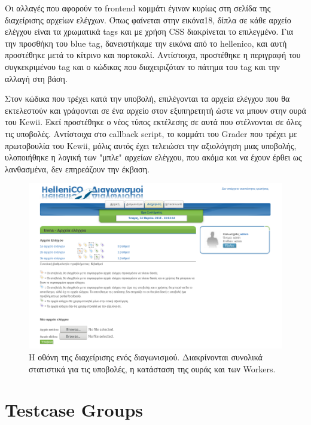 \documentclass[diploma]{softlab-thesis}
\begin{document}
\bigskip

Οι αλλαγές που αφορούν το frontend κομμάτι έγιναν κυρίως στη σελίδα της διαχείρισης
αρχείων ελέγχων. Όπως φαίνεται στην εικόνα18, δίπλα σε κάθε αρχείο ελέγχου είναι
τα χρωματικά tags και με χρήση CSS διακρίνεται το επιλεγμένο. Για την προσθήκη
του blue tag, δανειστήκαμε την εικόνα από το hellenico, και αυτή προστέθηκε μετά
το κίτρινο και πορτοκαλί. Αντίστοιχα, προστέθηκε η περιγραφή του συγκεκριμένου
tag και ο κώδικας που διαχειριζόταν το πάτημα του tag και την αλλαγή στη βάση.

\bigskip

Στον κώδικα που τρέχει κατά την υποβολή, επιλέγονται τα αρχεία ελέγχου που θα
εκτελεστούν και γράφονται σε ένα αρχείο στον εξυπηρετητή ώστε να μπουν στην
ουρά του Kewii. Εκεί προστέθηκε ο νέος τύπος εκτέλεσης σε αυτά που στέλνονται
σε όλες τις υποβολές. Αντίστοιχα στο callback script, το κομμάτι του Grader που
τρέχει με πρωτοβουλία του Kewii, μόλις αυτός έχει τελειώσει την αξιολόγηση μιας
υποβολής, υλοποιήθηκε η λογική των "μπλε" αρχείων ελέγχου, που ακόμα και να
έχουν έρθει ως λανθασμένα, δεν επηρεάζουν την έκβαση.

\begin{figure}
  \centering
  \includegraphics[scale=0.3]{Figures/bluetag.png}
  \caption[Οθόνη διαχείρισης προβλήματος]{Η οθόνη της διαχείρισης ενός διαγωνισμού.
  Διακρίνονται συνολικά στατιστικά για τις υποβολές, η κατάσταση της ουράς και των
  Workers.}
\end{figure}

\section{Testcase Groups}
\end{document}
